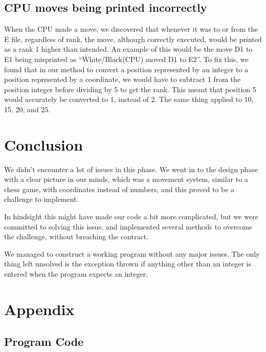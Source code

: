 \documentclass[12pt, a4paper]{article}
\begin{document}
	\subsection{CPU moves being printed incorrectly}
	When the CPU made a move, we discovered that whenever it was to or from the E file, regardless of rank, the move, although correctly executed, would be printed as a rank 1 higher than intended. An example of this would be the move D1 to E1 being misprinted as “White/Black(CPU) moved D1 to E2”. To fix this, we found that in our method to convert a position represented by an integer to a position represented by a coordinate, we would have to subtract 1 from the position integer before dividing by 5 to get the rank. This meant that position 5 would accurately be converted to 1, instead of 2. The same thing applied to 10, 15, 20, and 25.
	
	\section{Conclusion}
	We didn't encounter a lot of issues in this phase. We went in to the design phase with a clear picture in our minds, which was a movement system, similar to a chess game, with coordinates instead of numbers, and this proved to be a challenge to implement. 
	
	In hindsight this might have made our code a bit more complicated, but we were committed to solving this issue, and implemented several methods to overcome the challenge, without breaching the contract.
	
	We managed to construct a working program without any major issues. The only thing left unsolved is the exception thrown if anything other than an integer is entered when the program expects an integer.
	
	\section{Appendix}
	\subsection{Program Code}
	
\end{document}
